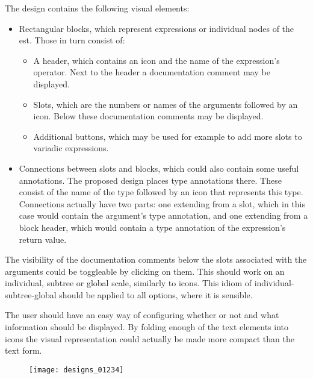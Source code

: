 The design contains the following visual elements:
\begin{itemize}
	\item Rectangular blocks, which represent expressions or individual nodes of the \acrshort{est}. Those in turn consist of:
	\begin{itemize}
		\item A header, which contains an icon and the name of the expression's operator. Next to the header a documentation comment may be displayed.
		\item Slots, which are the numbers or names of the arguments followed by an icon. Below these documentation comments may be displayed.
		\item Additional buttons, which may be used for example to add more slots to variadic expressions.
	\end{itemize}
	\item Connections between slots and blocks, which could also contain
          some useful annotations. The proposed design places type annotations
          there. These consist of the name of the type followed by an icon that
          represents this type. Connections actually have two parts: one
          extending from a slot, which in this case would contain the argument's
          type annotation, and one extending from a block header, which would
          contain a type annotation of the expression's return value.
\end{itemize}

The visibility of the documentation comments below the slots associated with the arguments could be toggleable by clicking on them. This should work on an individual, subtree or global scale, similarly to icons. This idiom of individual-subtree-global should be applied to all options, where it is sensible.

The user should have an easy way of configuring whether or not and what information should be displayed. By folding enough of the text elements into icons the visual representation could actually be made more compact than the text form.


\begin{figure}[h!]
\centering \texttt{[image: designs\_01234]}
\caption{}
\label{fig:designs_01234}
\end{figure}

